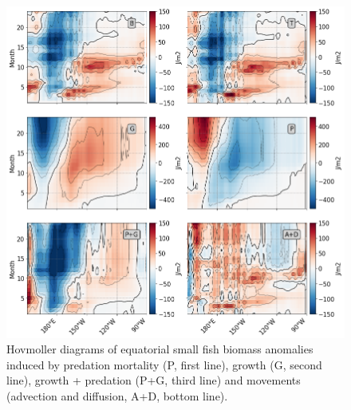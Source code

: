 \begin{figure}
	\centering
	\includegraphics[scale=0.4]{figs/hov_compo_l_3.png}	
	\caption{Hovmoller diagrams of equatorial small fish biomass anomalies induced by predation mortality (P, first line), growth (G, second line), growth + predation (P+G, third line) and movements (advection and diffusion, A+D, bottom line).}	
	\label{fig:hov_ape_trends_3}
\end{figure}

